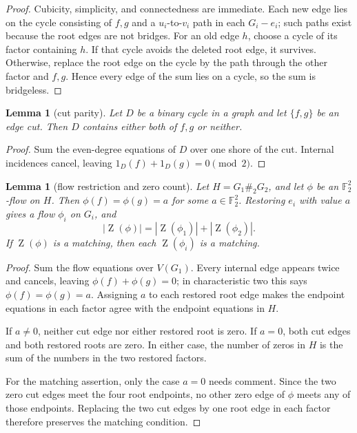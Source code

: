 \documentclass[11pt]{article}
\newtheorem{lemma}[theorem]{Lemma}
\theoremstyle{definition}
\newcommand{\F}{\mathbb F}
\newcommand{\Zer}{\operatorname{Z}}
\begin{document}
\begin{proof}
Cubicity, simplicity, and connectedness are immediate.  Each new edge
lies on the cycle consisting of \(f,g\) and a \(u_i\)-to-\(v_i\) path in
each \(G_i-e_i\); such paths exist because the root edges are not bridges.
For an old edge \(h\), choose a cycle of its factor containing \(h\).
If that cycle avoids the deleted root edge, it survives.  Otherwise,
replace the root edge on the cycle by the path through the other factor
and \(f,g\).  Hence every edge of the sum lies on a cycle, so the sum is
bridgeless.
\end{proof}

\begin{lemma}[cut parity]
\label{lem:cut}
Let \(D\) be a binary cycle in a graph and let
\(\{f,g\}\) be an edge cut.  Then \(D\) contains either both of \(f,g\)
or neither.
\end{lemma}

\begin{proof}
Sum the even-degree equations of \(D\) over one shore of the cut.
Internal incidences cancel, leaving
\(1_D(f)+1_D(g)=0\pmod2\).
\end{proof}

\begin{lemma}[flow restriction and zero count]
\label{lem:flow}
Let \(H=G_1\#_2G_2\), and let \(\phi\) be an \(\F_2^2\)-flow on \(H\).
Then \(\phi(f)=\phi(g)=a\) for some \(a\in\F_2^2\).  Restoring \(e_i\)
with value \(a\) gives a flow \(\phi_i\) on \(G_i\), and
\[
 |\Zer(\phi)|=|\Zer(\phi_1)|+|\Zer(\phi_2)|.
\]
If \(\Zer(\phi)\) is a matching, then each \(\Zer(\phi_i)\) is a matching.
\end{lemma}

\begin{proof}
Sum the flow equations over \(V(G_1)\).  Every internal edge appears
twice and cancels, leaving \(\phi(f)+\phi(g)=0\); in characteristic two
this says \(\phi(f)=\phi(g)=a\).  Assigning \(a\) to each restored root
edge makes the endpoint equations in each factor agree with the endpoint
equations in \(H\).

If \(a\ne0\), neither cut edge nor either restored root is zero.  If
\(a=0\), both cut edges and both restored roots are zero.  In either case,
the number of zeros in \(H\) is the sum of the numbers in the two
restored factors.

For the matching assertion, only the case \(a=0\) needs comment.  Since
the two zero cut edges meet the four root endpoints, no other zero edge of
\(\phi\) meets any of those endpoints.  Replacing the two cut edges by
one root edge in each factor therefore preserves the matching condition.
\end{proof}
\end{document}
